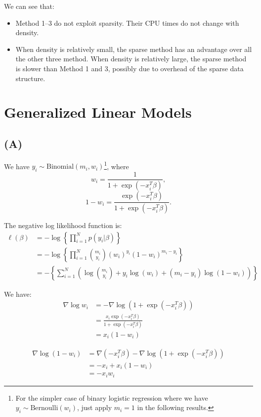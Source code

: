 \documentclass[a4paper,11pt]{article}
\begin{document}
We can see that:
\begin{itemize}
	\item Method 1--3 do not exploit sparsity. Their CPU times do not change with density.
	\item When density is relatively small, the sparse method has an advantage over all the other three method. When density is relatively large, the sparse method is slower than Method 1 and 3, possibly due to overhead of the sparse data structure.
\end{itemize} 

\section{Generalized Linear Models}

\subsection{(A)}
We have $y_i \sim \text{Binomial}(m_i, w_i)$\footnote{For the simpler case of binary logistic regression where we have $y_i \sim \text{Bernoulli}(w_i)$, just apply $m_i = 1$ in the following results.}, where 
$$
		w_i = \frac{1}{1+\exp(-x_i^T\beta)},
$$
$$
1-w_i = \frac{\exp(-x_i^T\beta)}{1+\exp(-x_i^T\beta)}.
$$

The negative log likelihood function is:
\begin{align}
		\ell(\beta) &= -\log \left \{ \prod_{i=1}^N p(y_i | \beta)  \right \} \\
		&= -\log \left \{ \prod_{i=1}^N \binom {m_i}{y_i}(w_i)^{y_i}(1-w_i)^{m_i-y_i}  \right \} \\
		&= - \left \{ \sum_{i=1}^{N} \left ( \log\binom {m_i}{y_i} + y_i \log(w_i) + (m_i-y_i)\log(1-w_i) \right ) \right \} 
	\end{align}
	
We have:
\begin{align}
\nabla \log w_i& = - \nabla \log (1 + \exp(-x_i^T\beta)	)\\
&= \frac{x_i \exp(-x_i^T\beta)}{1 + \exp(-x_i^T\beta)}\\
& = x_i(1-w_i)
\end{align}

\begin{align}
\nabla \log (1-w_i) & = \nabla (-x_i^T\beta)- \nabla \log (1 + \exp(-x_i^T\beta)	)\\
&= -x_i + x_i (1 - w_i)\\
& = -x_iw_i
\end{align}
\end{document}
